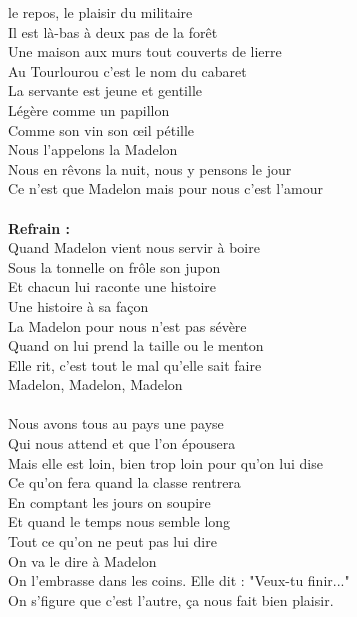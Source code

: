 
 le repos, le plaisir du militaire
\\Il est là-bas à deux pas de la forêt
\\Une maison aux murs tout couverts de lierre
\\Au Tourlourou c'est le nom du cabaret
\\La servante est jeune et gentille
\\Légère comme un papillon
\\Comme son vin son œil pétille
\\Nous l'appelons la Madelon
\\Nous en rêvons la nuit, nous y pensons le jour
\\Ce n'est que Madelon mais pour nous c'est l'amour
\\\\\textbf{Refrain :}
\\Quand Madelon vient nous servir à boire
\\Sous la tonnelle on frôle son jupon
\\Et chacun lui raconte une histoire
\\Une histoire à sa façon
\\La Madelon pour nous n'est pas sévère
\\Quand on lui prend la taille ou le menton
\\Elle rit, c'est tout le mal qu'elle sait faire
\\Madelon, Madelon, Madelon
\\\\Nous avons tous au pays une payse
\\Qui nous attend et que l'on épousera
\\Mais elle est loin, bien trop loin pour qu'on lui dise
\\Ce qu'on fera quand la classe rentrera
\\En comptant les jours on soupire
\\Et quand le temps nous semble long
\\Tout ce qu'on ne peut pas lui dire
\\On va le dire à Madelon
\\On l'embrasse dans les coins. Elle dit : "Veux-tu finir..."
\\On s'figure que c'est l'autre, ça nous fait bien plaisir.
